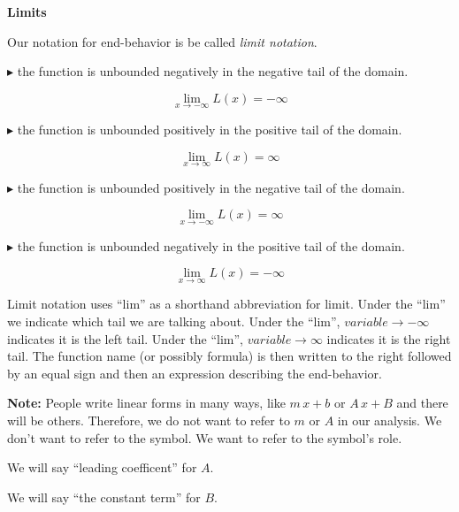 \documentclass{ximera}
\begin{document}
\begin{notation}  \textbf{\textcolor{red!50!green}{Limits}}

Our notation for end-behavior is be called \textit{limit notation}. 



\textbf{\textcolor{blue!55!black}{$\blacktriangleright$}} the function is unbounded negatively in the negative tail of the domain.

\[
\lim\limits_{x \to -\infty} L(x) = -\infty
\]


\textbf{\textcolor{blue!55!black}{$\blacktriangleright$}} the function is unbounded positively in the positive tail of the domain.

\[
\lim\limits_{x \to \infty} L(x) = \infty
\]


\textbf{\textcolor{blue!55!black}{$\blacktriangleright$}} the function is unbounded positively in the negative tail of the domain.

\[
\lim\limits_{x \to -\infty} L(x) = \infty
\]


\textbf{\textcolor{blue!55!black}{$\blacktriangleright$}} the function is unbounded negatively in the positive tail of the domain.

\[
\lim\limits_{x \to \infty} L(x) = -\infty
\]



Limit notation uses ``lim'' as a shorthand abbreviation for limit.  Under the ``lim'' we indicate which tail we are talking about.  Under the ``lim'', $variable \to -\infty$ indicates it is the left tail. Under the ``lim'', $variable \to \infty$ indicates it is the right tail.  The function name (or possibly formula) is then written to the right followed by an equal sign and then an expression describing the end-behavior. 



\end{notation}



\textbf{Note:} People write linear forms in many ways, like $m \, x + b$ or $A \, x + B$ and there will be others. Therefore, we do not want to refer to $m$ or $A$ in our analysis. We don't want to refer to the symbol. We want to refer to the symbol's role.

We will say ``leading coefficent'' for $A$.


We will say ``the constant term'' for $B$.
\end{document}
